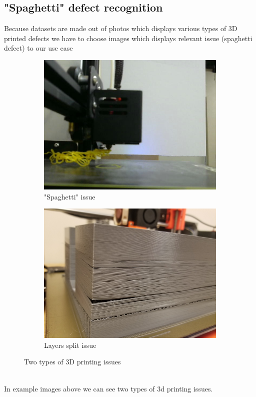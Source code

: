 \documentclass[12pt,a4paper]{article}
\begin{document}
\subsection{"Spaghetti" defect recognition}
Because datasets are made out of photos which displays various types of 3D printed defects we have to choose images which displays relevant issue (spaghetti defect) to our use case
\begin{figure}[b]
    \centering
    \begin{subfigure}[b]{0.45\textwidth}
        \centering
        \includegraphics[width=\textwidth]{no_support_0.jpg}
        \caption{"Spaghetti" issue\cite{onlineOpenSource1}}
        \label{fig:image1}
    \end{subfigure}
    \begin{subfigure}[b]{0.45\textwidth}
        \centering
        \includegraphics[width=\textwidth]{24382-129778-20190220-061954.jpg}
        \caption{Layers split issue\cite{onlineOpenSource2}}
        \label{fig:image2}
    \end{subfigure}
    \hfill

    \caption{Two types of 3D printing issues}
    \label{fig:test}
\end{figure}
\\In example images above we can see two types of 3d printing issues.
\end{document}
